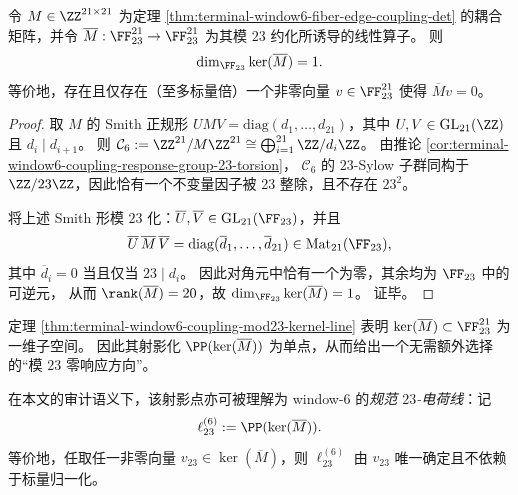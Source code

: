\begin{theorem}\label{thm:terminal-window6-coupling-mod23-kernel-line}
令 \(M\in\ZZ^{21\times 21}\) 为定理 \ref{thm:terminal-window6-fiber-edge-coupling-det} 的耦合矩阵，并令
\(\overline M:\FF_{23}^{21}\to \FF_{23}^{21}\) 为其模 \(23\) 约化所诱导的线性算子。
则
\[
\dim_{\FF_{23}}\ker(\overline M)=1.
\]
等价地，存在且仅存在（至多标量倍）一个非零向量 \(v\in \FF_{23}^{21}\) 使得 \(\overline Mv=0\)。
\end{theorem}
\begin{proof}
取 \(M\) 的 Smith 正规形 \(UMV=\mathrm{diag}(d_1,\dots,d_{21})\)，其中 \(U,V\in\mathrm{GL}_{21}(\ZZ)\) 且 \(d_i\mid d_{i+1}\)。
则
\(
\mathcal C_6:=\ZZ^{21}/M\ZZ^{21}\cong \bigoplus_{i=1}^{21}\ZZ/d_i\ZZ
\)。
由推论 \ref{cor:terminal-window6-coupling-response-group-23-torsion}，
\(\mathcal C_6\) 的 \(23\)-Sylow 子群同构于 \(\ZZ/23\ZZ\)，因此恰有一个不变量因子被 \(23\) 整除，且不存在 \(23^2\)。
\par
将上述 Smith 形模 \(23\) 化：\(\overline U,\overline V\in\mathrm{GL}_{21}(\FF_{23})\)，并且
\[
\overline U\,\overline M\,\overline V=\mathrm{diag}(\overline d_1,\dots,\overline d_{21})\in \mathrm{Mat}_{21}(\FF_{23}),
\]
其中 \(\overline d_i=0\) 当且仅当 \(23\mid d_i\)。
因此对角元中恰有一个为零，其余均为 \(\FF_{23}\) 中的可逆元，
从而 \(\rank(\overline M)=20\)，故 \(\dim_{\FF_{23}}\ker(\overline M)=1\)。
证毕。
\end{proof}

\begin{remark}\label{rem:terminal-window6-mod23-response-line}
定理 \ref{thm:terminal-window6-coupling-mod23-kernel-line} 表明 \(\ker(\overline M)\subset \FF_{23}^{21}\) 为一维子空间。
因此其射影化 \(\PP(\ker(\overline M))\) 为单点，从而给出一个无需额外选择的“模 \(23\) 零响应方向”。
\par
在本文的审计语义下，该射影点亦可被理解为 window-\(6\) 的\emph{规范 \(23\)-电荷线}：记
\[
\ell^{(6)}_{23}:=\PP(\ker(\overline M)).
\]
等价地，任取任一非零向量 \(v_{23}\in\ker(\overline M)\)，则 \(\ell^{(6)}_{23}\) 由 \(v_{23}\) 唯一确定且不依赖于标量归一化。
\end{remark}
